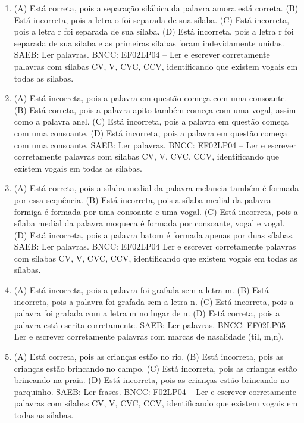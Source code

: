 \begin{enumerate}
\item
(A) Está correta, pois a separação silábica da palavra amora está correta.
(B) Está incorreta, pois a letra o foi separada de sua sílaba.
(C) Está incorreta, pois a letra r foi separada de sua sílaba.
(D) Está incorreta, pois a letra r foi separada de sua sílaba e as primeiras sílabas foram indevidamente unidas.
SAEB: Ler palavras.
BNCC: EF02LP04 -- Ler e escrever corretamente palavras com
sílabas CV, V, CVC, CCV, identificando que existem vogais em todas as
sílabas.

\item
(A) Está incorreta, pois a palavra em questão começa com uma consoante.
(B) Está correta, pois a palavra apito também começa com uma vogal, assim como a palavra anel.
(C) Está incorreta, pois a palavra em questão começa com uma consoante.
(D) Está incorreta, pois a palavra em questão começa com uma consoante.
SAEB: Ler palavras.
BNCC: EF02LP04 -- Ler e escrever corretamente palavras com
sílabas CV, V, CVC, CCV, identificando que existem vogais em todas as
sílabas.

\item
(A) Está correta, pois a sílaba medial da palavra melancia também é formada por essa sequência.
(B) Está incorreta, pois a sílaba medial da palavra formiga é formada por uma consoante e uma vogal.
(C) Está incorreta, pois a sílaba medial da palavra moqueca é formada por consoante, vogal e vogal.
(D) Está incorreta, pois a palavra batom é formada apenas por duas sílabas.
SAEB: Ler palavras.
BNCC: EF02LP04 Ler e escrever corretamente palavras com
sílabas CV, V, CVC, CCV, identificando que existem vogais em todas as
sílabas.

\item
(A) Está incorreta, pois a palavra foi grafada sem a letra m.
(B) Está incorreta, pois a palavra foi grafada sem a letra n.
(C) Está incorreta, pois a palavra foi grafada com a letra m no lugar de n.
(D) Está correta, pois a palavra está escrita corretamente.
SAEB: Ler palavras.
BNCC: EF02LP05 -- Ler e escrever corretamente palavras com marcas
de nasalidade (til, m,n).

\item
(A) Está correta, pois as crianças estão no rio.
(B) Está incorreta, pois as crianças estão brincando no campo.
(C) Está incorreta, pois as crianças estão brincando na praia.
(D) Está incorreta, pois as crianças estão brincando no parquinho.
SAEB: Ler frases.
BNCC: F02LP04 -- Ler e escrever corretamente palavras com sílabas
CV, V, CVC, CCV, identificando que existem vogais em todas as sílabas.


\end{enumerate}
